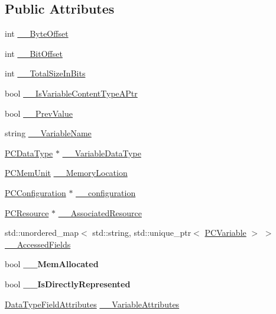 \subsection*{Public Attributes}
\begin{DoxyCompactItemize}
\item 
int \hyperlink{classpc__emulator_1_1PCVariable_a8297ed459b779cf1c77df8112b88bf87}{\+\_\+\+\_\+\+Byte\+Offset}
\item 
int \hyperlink{classpc__emulator_1_1PCVariable_aefb556613afb059e574d3fb51db650c9}{\+\_\+\+\_\+\+Bit\+Offset}
\item 
int \hyperlink{classpc__emulator_1_1PCVariable_a2e4857bfe8626d81a15ac688077e6551}{\+\_\+\+\_\+\+Total\+Size\+In\+Bits}
\item 
bool \hyperlink{classpc__emulator_1_1PCVariable_a3b2e04044a660a8f58ca660e5db60ae3}{\+\_\+\+\_\+\+Is\+Variable\+Content\+Type\+A\+Ptr}
\item 
bool \hyperlink{classpc__emulator_1_1PCVariable_ac3f4b918f17b9d2ee70d1a4aee8c3305}{\+\_\+\+\_\+\+Prev\+Value}
\item 
string \hyperlink{classpc__emulator_1_1PCVariable_a5cd9e5aa5449218af75e5457ca7fe791}{\+\_\+\+\_\+\+Variable\+Name}
\item 
\hyperlink{classpc__emulator_1_1PCDataType}{P\+C\+Data\+Type} $\ast$ \hyperlink{classpc__emulator_1_1PCVariable_aa54a7c7f6806d301641e61f13453f555}{\+\_\+\+\_\+\+Variable\+Data\+Type}
\item 
\hyperlink{classpc__emulator_1_1PCMemUnit}{P\+C\+Mem\+Unit} \hyperlink{classpc__emulator_1_1PCVariable_a24b16f945f808dada7e6633877a749c1}{\+\_\+\+\_\+\+Memory\+Location}
\item 
\hyperlink{classpc__emulator_1_1PCConfiguration}{P\+C\+Configuration} $\ast$ \hyperlink{classpc__emulator_1_1PCVariable_a83612d987fb797fc979e0c232076c675}{\+\_\+\+\_\+configuration}
\item 
\hyperlink{classpc__emulator_1_1PCResource}{P\+C\+Resource} $\ast$ \hyperlink{classpc__emulator_1_1PCVariable_aee0f12f8e7ef8f3a53953823f8a28d22}{\+\_\+\+\_\+\+Associated\+Resource}
\item 
std\+::unordered\+\_\+map$<$ std\+::string, std\+::unique\+\_\+ptr$<$ \hyperlink{classpc__emulator_1_1PCVariable}{P\+C\+Variable} $>$ $>$ \hyperlink{classpc__emulator_1_1PCVariable_a54c91836070f95a12e0cc1e25d683f88}{\+\_\+\+\_\+\+Accessed\+Fields}
\item 
bool {\bfseries \+\_\+\+\_\+\+Mem\+Allocated}\hypertarget{classpc__emulator_1_1PCVariable_aaad6a898da306863c48d8843644c352d}{}\label{classpc__emulator_1_1PCVariable_aaad6a898da306863c48d8843644c352d}

\item 
bool {\bfseries \+\_\+\+\_\+\+Is\+Directly\+Represented}\hypertarget{classpc__emulator_1_1PCVariable_ad97a3da5c94a30e56da4ed21fa85d104}{}\label{classpc__emulator_1_1PCVariable_ad97a3da5c94a30e56da4ed21fa85d104}

\item 
\hyperlink{structpc__emulator_1_1DataTypeFieldAttributesStruct}{Data\+Type\+Field\+Attributes} \hyperlink{classpc__emulator_1_1PCVariable_a53d823bc25d05fa93483bcbbdf15c704}{\+\_\+\+\_\+\+Variable\+Attributes}
\end{DoxyCompactItemize}
